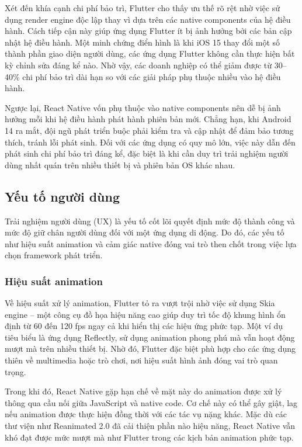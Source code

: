     Xét đến khía cạnh chi phí bảo trì, Flutter cho thấy ưu thế rõ rệt nhờ việc sử dụng render engine độc lập thay vì dựa trên các native components của hệ điều hành. Cách tiếp cận này giúp ứng dụng Flutter ít bị ảnh hưởng bởi các bản cập nhật hệ điều hành. Một minh chứng điển hình là khi iOS 15 thay đổi một số thành phần giao diện người dùng, các ứng dụng Flutter không cần thực hiện bất kỳ chỉnh sửa đáng kể nào. Nhờ vậy, các doanh nghiệp có thể giảm được từ 30–40\% chi phí bảo trì dài hạn so với các giải pháp phụ thuộc nhiều vào hệ điều hành.

    \vspace{0.5em}

    Ngược lại, React Native vốn phụ thuộc vào native components nên dễ bị ảnh hưởng mỗi khi hệ điều hành phát hành phiên bản mới. Chẳng hạn, khi Android 14 ra mắt, đội ngũ phát triển buộc phải kiểm tra và cập nhật để đảm bảo tương thích, tránh lỗi phát sinh. Đối với các ứng dụng có quy mô lớn, việc này dẫn đến phát sinh chi phí bảo trì đáng kể, đặc biệt là khi cần duy trì trải nghiệm người dùng nhất quán trên nhiều thiết bị và phiên bản OS khác nhau.

\subsection{Yếu tố người dùng}


    Trải nghiệm người dùng (UX) là yếu tố cốt lõi quyết định mức độ thành công và mức độ giữ chân người dùng đối với một ứng dụng di động. Do đó, các yếu tố như hiệu suất animation và cảm giác native đóng vai trò then chốt trong việc lựa chọn framework phát triển.

\subsubsection{Hiệu suất animation}


    Về hiệu suất xử lý animation, Flutter tỏ ra vượt trội nhờ việc sử dụng Skia engine – một công cụ đồ họa hiệu năng cao giúp duy trì tốc độ khung hình ổn định từ 60 đến 120 fps ngay cả khi hiển thị các hiệu ứng phức tạp. Một ví dụ tiêu biểu là ứng dụng Reflectly, sử dụng animation phong phú mà vẫn hoạt động mượt mà trên nhiều thiết bị. Nhờ đó, Flutter đặc biệt phù hợp cho các ứng dụng thiên về multimedia hoặc trò chơi, nơi hiệu suất hình ảnh đóng vai trò quan trọng.

    \vspace{0.5em}

    Trong khi đó, React Native gặp hạn chế về mặt này do animation được xử lý thông qua cầu nối giữa JavaScript và native code. Cơ chế này có thể gây giật, lag nếu animation được thực hiện đồng thời với các tác vụ nặng khác. Mặc dù các thư viện như Reanimated 2.0 đã cải thiện phần nào hiệu năng, React Native vẫn khó đạt được mức mượt mà như Flutter trong các kịch bản animation phức tạp.

